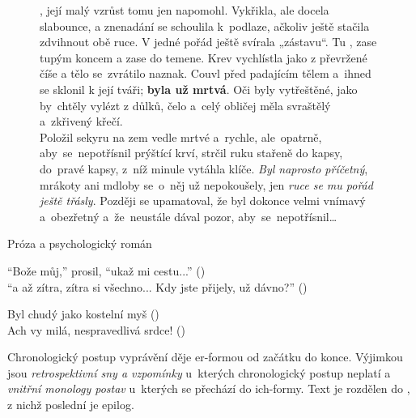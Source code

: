 \documentclass[FGBook.tex]{subfiles}
\begin{document}

\noindent\begin{figure}\footnotesize
{}
\setlength{\parindent}{3pt}
, její malý vzrůst tomu jen napomohl.
Vykřikla, ale docela slabounce, a znenadání se schoulila k~podlaze,
ačkoliv ještě stačila zdvihnout obě ruce.
V jedné pořád ještě svírala „zástavu“.
Tu , zase tupým koncem a zase do temene.
Krev vychlístla jako z převržené číše a tělo se~zvrátilo naznak.
Couvl před padajícím tělem a~ihned se sklonil k její tváři; \textbf{byla už mrtvá}.
Oči byly vytřeštěné, jako by~chtěly vylézt z důlků,
čelo a~celý obličej měla svraštělý a~zkřivený křečí.\\
Položil sekyru na zem vedle mrtvé a~rychle, ale~opatrně,
aby~se~nepotřísnil prýštící krví, strčil ruku stařeně do kapsy,
do~pravé kapsy, z~níž minule vytáhla klíče.
\textit{Byl naprosto příčetný}, mrákoty ani mdloby se~o~něj už nepokoušely,
jen \textit{ruce se mu pořád ještě třásly}.
Později se upamatoval, že byl dokonce velmi vnímavý
a~obezřetný a~že~neustále dával pozor, aby~se~nepotřísnil…
\end{figure}


\noindent Próza a psychologický román



\noindent 
\enquote{Bože můj,} prosil, \enquote{ukaž mi cestu...} () \\
\enquote{a až zítra, zítra si všechno... Kdy jste přijely, už dávno?} ()

\noindent 
Byl chudý jako kostelní myš () \\
Ach vy milá, nespravedlivá srdce! ()

\noindent 
Chronologický postup vyprávění děje er-formou od začátku do konce.
Výjimkou jsou \textit{retrospektivní sny a vzpomínky} u~kterých chronologický postup neplatí a \textit{vnitřní monology postav} u~kterých se přechází do ich-formy.
Text je rozdělen do , z nichž poslední je epilog.
\end{document}
